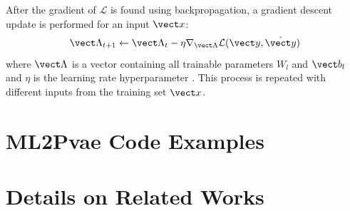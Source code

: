 After the gradient of $\mathcal{L}$ is found using backpropagation, a gradient descent update is performed for an input $\vect x$:
\begin{equation}
  \vect \Lambda_{t+1} \gets \vect \Lambda_{t} - \eta \nabla_{\vect \Lambda} \mathcal{L}(\vect y, \hat{\vect y})
  \label{eq:grad_update}
\end{equation}
where $\vect \Lambda$ is a vector containing all trainable parameters $W_l$ and $\vect b_l$ and $\eta$ is the learning rate hyperparameter \cite{ruder2017}. This process is repeated with different inputs from the training set $\vect x$. 


\chapter{\textbf{ML2Pvae} Code Examples}


\chapter{Details on Related Works}


